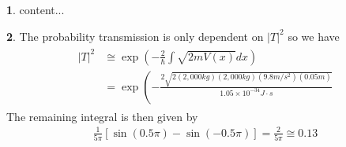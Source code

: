 \documentclass[11pt, twocolumn]{article}
\theoremstyle{definition}
\newtheorem{ans}{}
\begin{document}
	\begin{ans}
		content...
	\end{ans}
	\begin{ans}
		The probability transmission is only dependent on $ |T|^2 $ so we have 
		\begin{align*}
		\begin{aligned} | T | ^ { 2 } & \cong \exp \left( - \frac { 2 } { \hbar } \int \sqrt { 2 m V ( x ) } d x \right) \\ & = \exp \left( - \frac { 2 \sqrt { 2 ( 2,000 k g ) ( 2,000 k g ) \left( 9.8 m / s ^ { 2 } \right) ( 0.05 m ) } } { 1.05 \times 10 ^ { - 34 } J \cdot s } \right. \end{aligned}
		\end{align*}
		The remaining integral is then given by
		\begin{align*}
		\frac { 1 } { 5 \pi } [ \sin ( 0.5 \pi ) - \sin ( - 0.5 \pi ) ] = \frac { 2 } { 5 \pi } \cong 0.13
		\end{align*}
	\end{ans}
	
	
\end{document}
